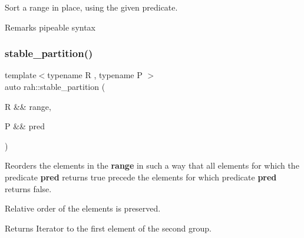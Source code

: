 Sort a range in place, using the given predicate. 

\begin{DoxyRemark}{Remarks}
pipeable syntax
\end{DoxyRemark}

\begin{DoxyCodeInclude}{0}
\end{DoxyCodeInclude}

\begin{DoxyCodeInclude}{0}
\end{DoxyCodeInclude}
\mbox{\label{namespacerah_ac184b21a98515705f9b4845875fb689b}} 
\subsubsection{\texorpdfstring{stable\_partition()}{stable\_partition()}\hspace{0.1cm}{\footnotesize\ttfamily [1/2]}}
{\footnotesize\ttfamily template$<$typename R , typename P $>$ \\
auto rah\+::stable\+\_\+partition (\begin{DoxyParamCaption}\item[{R \&\&}]{range,  }\item[{P \&\&}]{pred }\end{DoxyParamCaption})}



Reorders the elements in the {\bfseries{range}} in such a way that all elements for which the predicate {\bfseries{pred}} returns {\ttfamily true} precede the elements for which predicate {\bfseries{pred}} returns false. 

Relative order of the elements is preserved. \begin{DoxyReturn}{Returns}
Iterator to the first element of the second group.
\end{DoxyReturn}

